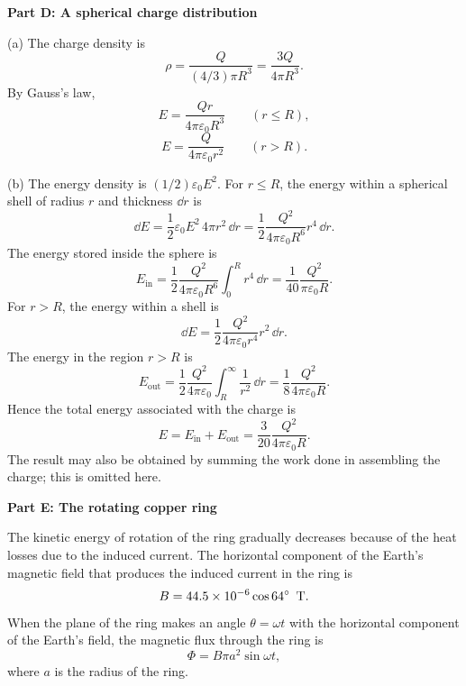 \textbf{Part D: A spherical charge distribution}

(a) The charge density is
\begin{equation*}
\rho=\frac{Q}{(4/3)\pi R^3}=\frac{3Q}{4\pi R^3} .
\end{equation*}
By Gauss's law,
\begin{equation*}
E=\frac{Qr}{4\pi\varepsilon_0R^3}\qquad(r\le R),
\end{equation*}
\begin{equation*}
E=\frac{Q}{4\pi\varepsilon_0r^2}\qquad(r>R).
\end{equation*}

(b) The energy density is $(1/2)\varepsilon_0E^2$. For $r\le R$, the energy within a spherical shell of radius $r$ and thickness $\dd r$ is
\begin{equation*}
\dd E=\frac{1}{2}\varepsilon_0E^2\,4\pi r^2\,\dd r
=\frac{1}{2}\frac{Q^2}{4\pi\varepsilon_0R^6}r^4\,\dd r .
\end{equation*}
The energy stored inside the sphere is
\begin{equation*}
E_{\text{in}}=\frac{1}{2}\frac{Q^2}{4\pi\varepsilon_0R^6}\int_0^R r^4\,\dd r
=\frac{1}{40}\frac{Q^2}{\pi\varepsilon_0R} .
\end{equation*}
For $r>R$, the energy within a shell is
\begin{equation*}
\dd E=\frac{1}{2}\frac{Q^2}{4\pi\varepsilon_0r^4}r^2\,\dd r .
\end{equation*}
The energy in the region $r>R$ is
\begin{equation*}
E_{\text{out}}=\frac{1}{2}\frac{Q^2}{4\pi\varepsilon_0}
\int_R^\infty\frac{1}{r^2}\,\dd r
=\frac{1}{8}\frac{Q^2}{4\pi\varepsilon_0R} .
\end{equation*}
Hence the total energy associated with the charge is
\begin{equation*}
E=E_{\text{in}}+E_{\text{out}}
=\frac{3}{20}\frac{Q^2}{4\pi\varepsilon_0R} .
\end{equation*}
The result may also be obtained by summing the work done in assembling the charge; this is omitted here.

\textbf{Part E: The rotating copper ring}

The kinetic energy of rotation of the ring gradually decreases because of the heat losses due to the induced current. The horizontal component of the Earth's magnetic field that produces the induced current in the ring is
\begin{equation*}
B=44.5\times10^{-6}\cos64^{\circ}\ \,\mathrm{T} .
\end{equation*}
When the plane of the ring makes an angle $\theta=\omega t$ with the horizontal component of the Earth's field, the magnetic flux through the ring is
\begin{equation*}
\Phi=B\pi a^2\sin\omega t ,
\end{equation*}
where $a$ is the radius of the ring.

